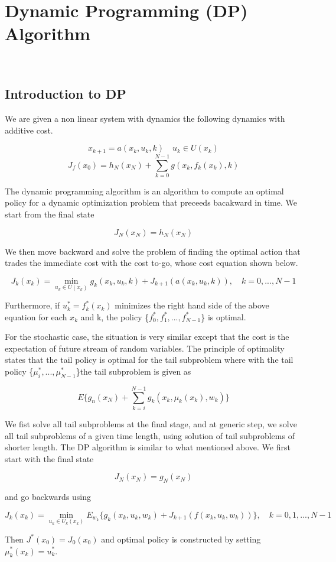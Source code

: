 \documentclass[twoside]{article}
\begin{document}
\section{Dynamic Programming (DP) Algorithm}
\\ \subsection{Introduction to DP}
We are given a non linear system with dynamics the following dynamics with additive cost.
\begin{center}
    \[ x_{k+1} = a(x_k, u_k, k) \quad u_k \in U(x_k)   \]
    \[J_f(x_0) = h_N(x_N) + \sum_{k=0}^{N-1} g(x_k, f_k(x_k), k) \]
\end{center}
The dynamic programming algorithm is an algorithm to compute an optimal policy for a dynamic optimization problem that preceeds bacakward in time. We start from the final state
\begin{center}
    \[J_N(x_N) = h_N(x_N)\]
\end{center}
We then move backward and solve the problem of finding the optimal action that trades the immediate cost with the cost to-go, whose cost equation shown below.
\begin{center}
    \[J_k(x_k) = \min_{u_k\in U(x_k)} g_k(x_k, u_k, k) + J_{k+1}(a(x_k, u_k,k)), \quad k = 0,...,N-1  \]
\end{center}
Furthermore, if $u_k^* = f_k^*(x_k)$ minimizes the right hand side of the above equation for each $x_k$ and k, the policy \{$f_0^*, f_1^*,...,f_{N-1}^*$\} is optimal.


For the stochastic case, the situation is very similar except that the cost is the expectation of future stream of random variables. The principle of optimality states that the tail policy is optimal for the tail subproblem where with the tail policy \{$\mu_i^*, ..., \mu_{N-1}^*$\}the tail subproblem is given as
\begin{center}
    \[E\{g_n(x_N) + \sum_{k=i}^{N-1}g_k(x_k,\mu_k(x_k), w_k) \} \]
\end{center}

We fist solve all tail subproblems at the final stage, and at generic step, we solve all tail subproblems of a given time length, using solution of tail subproblems of shorter length. The DP algorithm is similar to what mentioned above. We first start with the final state
\begin{center}
    \[J_N(x_N)=g_N(x_N)\]
\end{center}
and go backwards using
\begin{center}
    \[J_k(x_k)=\min_{u_k\in U_k(x_k)} E_{w_k}\{g_k(x_k, u_k, w_k) + J_{k+1}(f(x_k, u_k, w_k))\}, \quad k = 0, 1, ..., N-1\]
\end{center}
Then $J^*(x_0)=J_0(x_0)$ and optimal policy is constructed by setting $\mu_k^*(x_k)=u_k^*$.
\end{document}
